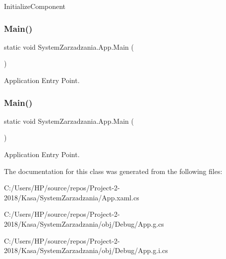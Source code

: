 Initialize\+Component 

\mbox{\label{class_system_zarzadzania_1_1_app_afc35a78a384092bf9baa0d4c310c2ebe}} 
\subsubsection{\texorpdfstring{Main()}{Main()}\hspace{0.1cm}{\footnotesize\ttfamily [1/2]}}
{\footnotesize\ttfamily static void System\+Zarzadzania.\+App.\+Main (\begin{DoxyParamCaption}{ }\end{DoxyParamCaption})\hspace{0.3cm}{\ttfamily [static]}}



Application Entry Point. 

\mbox{\label{class_system_zarzadzania_1_1_app_afc35a78a384092bf9baa0d4c310c2ebe}} 
\subsubsection{\texorpdfstring{Main()}{Main()}\hspace{0.1cm}{\footnotesize\ttfamily [2/2]}}
{\footnotesize\ttfamily static void System\+Zarzadzania.\+App.\+Main (\begin{DoxyParamCaption}{ }\end{DoxyParamCaption})\hspace{0.3cm}{\ttfamily [static]}}



Application Entry Point. 



The documentation for this class was generated from the following files\+:\begin{DoxyCompactItemize}
\item 
C\+:/\+Users/\+H\+P/source/repos/\+Project-\/2-\/2018/\+Kasa/\+System\+Zarzadzania/App.\+xaml.\+cs\item 
C\+:/\+Users/\+H\+P/source/repos/\+Project-\/2-\/2018/\+Kasa/\+System\+Zarzadzania/obj/\+Debug/App.\+g.\+cs\item 
C\+:/\+Users/\+H\+P/source/repos/\+Project-\/2-\/2018/\+Kasa/\+System\+Zarzadzania/obj/\+Debug/App.\+g.\+i.\+cs\end{DoxyCompactItemize}
